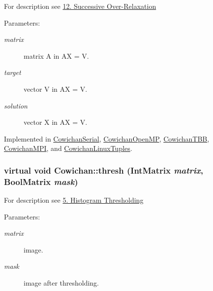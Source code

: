 For description see \hyperlink{index_sor_sec}{12. Successive Over-Relaxation} \begin{Desc}
\item[Parameters:]
\begin{description}
\item[{\em matrix}]matrix A in AX = V. \item[{\em target}]vector V in AX = V. \item[{\em solution}]vector X in AX = V. \end{description}
\end{Desc}


Implemented in \hyperlink{class_cowichan_serial_6e8b06711d976de1adc1e4dc81e560e5}{CowichanSerial}, \hyperlink{class_cowichan_open_m_p_d6482d0369a26a51ef0e37ab238fc664}{CowichanOpenMP}, \hyperlink{class_cowichan_t_b_b_dbb32ce457d0edca6815ab1cb2459276}{CowichanTBB}, \hyperlink{class_cowichan_m_p_i_7388c844e8aa73ab0923443a3a7ef069}{CowichanMPI}, and \hyperlink{class_cowichan_linux_tuples_aa2c469c3f520a5a56c5ec1ac9a5a6c6}{CowichanLinuxTuples}.\hypertarget{class_cowichan_a0b633b8c1f21884e0998a9c7020c08c}{
\subsubsection[{thresh}]{\setlength{\rightskip}{0pt plus 5cm}virtual void Cowichan::thresh ({\bf IntMatrix} {\em matrix}, \/  {\bf BoolMatrix} {\em mask})}}
\label{class_cowichan_a0b633b8c1f21884e0998a9c7020c08c}


For description see \hyperlink{index_thresh_sec}{5. Histogram Thresholding} \begin{Desc}
\item[Parameters:]
\begin{description}
\item[{\em matrix}]image. \item[{\em mask}]image after thresholding. \end{description}
\end{Desc}


